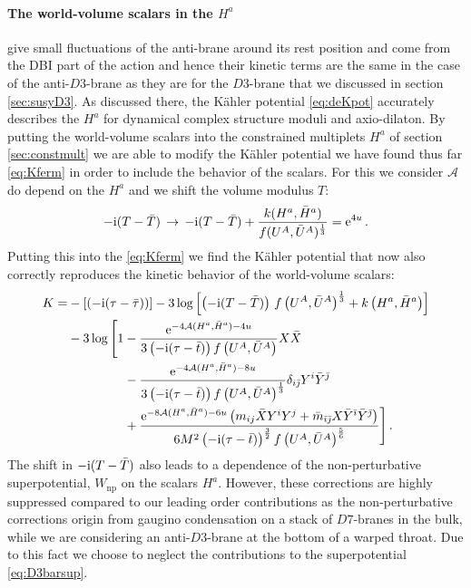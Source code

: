 \documentclass[12pt]{report}
\newcommand{\be}{\begin{equation}}
\newcommand{\ee}{\end{equation}}
\newcommand{\bea}{\begin{equation}\begin{aligned}}
\newcommand{\eea}{\end{aligned}\end{equation}}
\def\rmi{{\rm i}}
\def\rme{{\rm e}}
\def\ib{{\bar \imath}}
\def\jb{{\bar \jmath}}
\begin{document}
\paragraph{The world-volume scalars in the $H^a$} give small fluctuations of the anti-brane around its rest position and come from the DBI part of the action and hence their kinetic terms are the same in the case of the anti-$D3$-brane as they are for the $D3$-brane that we discussed in section \ref{sec:susyD3}. As discussed there, the Kähler potential \eqref{eq:deKpot} accurately describes the $H^a$ for dynamical complex structure moduli and axio-dilaton. By putting the world-volume scalars into the constrained multiplets $H^a$ of section \ref{sec:constmult} we are able to modify the Kähler potential we have found thus far \eqref{eq:Kferm} in order to include the behavior of the scalars. For this we consider $\mathcal{A}$ do depend on the $H^a$ and we shift the volume modulus $T$:
\be 
-\rmi (T-\bar{T}) \,\to \, -\rmi(T-\bar{{T}}) + \frac{k(H^a,\bar{H}^a)}{f(U^A,\bar{U}^A)^{\frac{1}{3}}}=\rme^{4u}\,.
\ee
Putting this into the \eqref{eq:Kferm} we find the Kähler potential that now also correctly reproduces the kinetic behavior of the world-volume scalars:
\bea 
K = &-\left[\left(-\rmi(\tau-\bar{\tau})\right)\right]-3 \log \left[\left(-\rmi(T-\bar{T})\right)\,f\left(U^A,\bar{U}^A\right)^{\frac{1}{3}}+k\left(H^a,\bar{H}^a\right)\right]\\
&- 3 \log\Bigg[1-\frac{\rme^{-4\mathcal{A}(H^a,\bar{H}^a)-4u}}{3\left(-\rmi(\tau-\bar{t})\right)f\left(U^A,\bar{U}^A\right)}X\bar{X}\\
&\qquad\qquad\;\,-\frac{\rme^{-4\mathcal{A}(H^a,\bar{H}^a)-8u}}{3\left(-\rmi(\tau-\bar{t})\right)f\left(U^A,\bar{U}^A\right)^{\frac{1}{3}}}\delta_{i\jb}Y^i\bar{Y}^\jb\\
&\qquad\qquad\;\,+\frac{\rme^{-8\mathcal{A}(H^a,\bar{H}^a)-6u}\left(m_{ij}\bar{X}Y^iY^j+\bar{m}_{\ib\jb}X \bar{Y}^\ib\bar{Y}^\jb\right)}{6 M^2 \left(-\rmi(\tau-\bar{t})\right)^{\frac{3}{2}}f\left(U^A,\bar{U}^A\right)^{\frac{5}{6}}}\Bigg]\,.
\label{eq:KpotbarD3}
\eea
The shift in $-\rmi (T-\bar{T})$ also leads to a dependence of the non-perturbative superpotential, $W_{\text{np}}$ on the scalars $H^a$. However, these corrections are highly suppressed compared to our leading order contributions as the non-perturbative corrections origin from gaugino condensation on a stack of $D7$-branes in the bulk, while we are considering an anti-$D3$-brane at the bottom of a warped throat. Due to this fact we choose to neglect the contributions to the superpotential \eqref{eq:D3barsup}.
\end{document}
